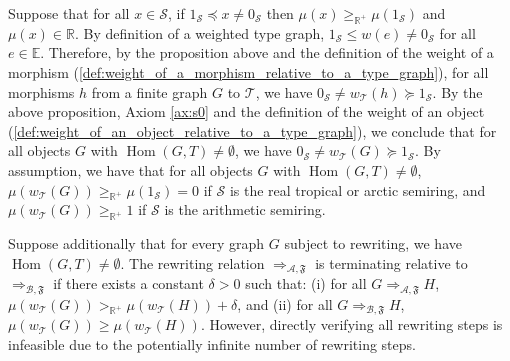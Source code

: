 
    Suppose that for all $x \in \mathcal{S}$, if $ 1_\mathcal{S} \preceq x \neq 0_\mathcal{S}$ then $\mu(x) \geq_{\mathbb{R}^+} \mu(1_\mathcal{S})$ and $\mu(x) \in \mathbb{R}$. 
    By definition of a weighted type graph, $1_\mathcal{S} \leq w(e)\neq 0_\mathcal{S}$ for all $e\in\mathbb{E}$.
    Therefore, by the proposition above and the definition of the weight of a morphism (\autoref{def:weight_of_a_morphism_relative_to_a_type_graph}), for all morphisms \( h \) from a finite graph $G$ to $\mathcal{T}$, we have \( 0_\mathcal{S} \neq w_\mathcal{T}(h) \succeq 1_\mathcal{S} \). 
    By the above proposition, Axiom \eqref{ax:s0} and the definition of the weight of an object (\autoref{def:weight_of_an_object_relative_to_a_type_graph}), we conclude that for all objects \( G \) with $\operatorname{Hom}(G,T)\neq \emptyset$, we have \( 0_\mathcal{S} \neq w_\mathcal{T}(G) \succeq 1_\mathcal{S} \). By assumption, we have that for all objects \( G \) with $\operatorname{Hom}(G,T)\neq \emptyset$, \( \mu(w_\mathcal{T}(G)) \geq_{\mathbb{R}^+} \mu(1_\mathcal{S}) = 0 \) if $\mathcal{S}$ is the real tropical or arctic semiring, and \( \mu(w_\mathcal{T}(G)) \geq_{\mathbb{R}^+} 1 \) if $\mathcal{S}$ is the arithmetic semiring.

Suppose additionally that for every graph $G$ subject to rewriting, we have $\operatorname{Hom}(G,T)\neq \emptyset$. The rewriting relation \( \Rightarrow_{\mathcal{A},\mathfrak{F}} \) is terminating relative to $\Rightarrow_{\mathcal{B},\mathfrak{F}}$ if there exists a constant $\delta > 0$ such that: (i) for all \(G \Rightarrow_{\mathcal{A},\mathfrak{F}} H\), \( \mu(w_\mathcal{T}(G)) >_{\mathbb{R}^+} \mu(w_\mathcal{T}(H)) + \delta \), and (ii) for all \(G \Rightarrow_{\mathcal{B},\mathfrak{F}} H\), \( \mu(w_\mathcal{T}(G)) \geq \mu(w_\mathcal{T}(H)) \). However, directly verifying all rewriting steps is infeasible due to the potentially infinite number of rewriting steps.


